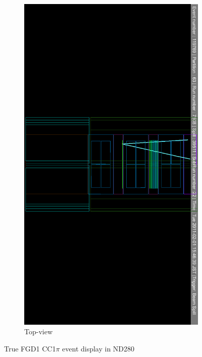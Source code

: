 \begin{itemize}
\begin{figure}[h]
\begin{subfigure}[t]{0.49\textwidth}
			\includegraphics[width=\textwidth, trim={0mm 170mm 10mm 170mm}, clip]{figures/numu/evtdisplay/CC1pi_7508_22_119769_ortX0Z_all}
			\caption{Top-view}
		\end{subfigure}
		\caption{True FGD1 CC1$\pi$ event display in ND280}
		\label{fig:cc1pi_evtdisplay}
	\end{figure}
	

\end{itemize}

